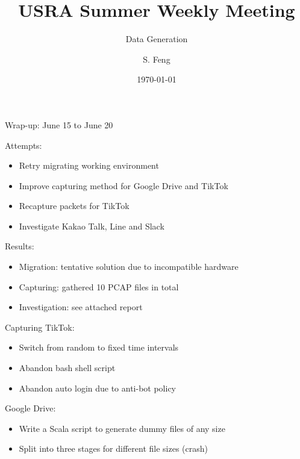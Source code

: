 \documentclass{beamer}
\title[Weekly Meeting]{
    USRA Summer Weekly Meeting
}
\subtitle[]{Data Generation}
\author[Shuo Feng]{S. Feng}
\institute[NIMS Lab]{
  NIMS Lab\\
  USRA Summer 2023}
\date{\today}
\begin{document}
\frame{\titlepage}

\begin{frame}{Wrap-up: June 15 to June 20}

  Attempts:
  \begin{itemize}
    \item Retry migrating working environment
    \item Improve capturing method for Google Drive and TikTok
    \item Recapture packets for TikTok
    \item Investigate Kakao Talk, Line and Slack
  \end{itemize}

  Results:
  \begin{itemize}
    \item Migration: tentative solution due to incompatible hardware
    \item Capturing: gathered 10 PCAP files in total
    \item Investigation: see attached report
  \end{itemize}

\end{frame}

\begin{frame}{Capturing}
  TikTok:
  \begin{itemize}
    \item Switch from random to fixed time intervals
    \item Abandon bash shell script
    \item Abandon auto login due to anti-bot policy
  \end{itemize}

  Google Drive:
  \begin{itemize}
    \item Write a Scala script to generate dummy files of any size
    \item Split into three stages for different file sizes (crash)
  \end{itemize}

\end{frame}
\end{document}
